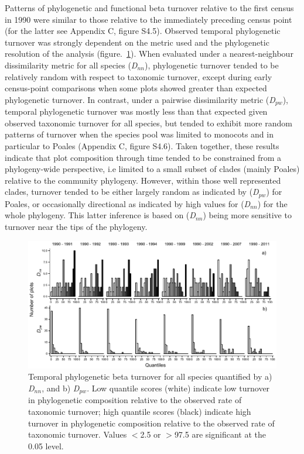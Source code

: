 Patterns of phylogenetic and functional beta turnover relative to the first census in 1990 were similar to those relative to the immediately preceding census point (for the latter see Appendix C, figure S4.5). Observed temporal phylogenetic turnover was strongly dependent on the metric used and the phylogenetic resolution of the analysis (figure.~\ref{phylo_betadiv}). When evaluated under a nearest-neighbour dissimilarity metric for all species (\textit{D}$_{nn}$), phylogenetic turnover tended to be relatively random with respect to taxonomic turnover, except during early census-point comparisons when some plots showed greater than expected phylogenetic turnover. In contrast, under a pairwise dissimilarity metric (\textit{D}$_{pw}$), temporal phylogenetic turnover was mostly less than that expected given observed taxonomic turnover for all species, but tended to exhibit more random patterns of turnover when the species pool was limited to monocots and in particular to Poales (Appendix C, figure S4.6). Taken together, these results indicate that plot composition through time tended to be constrained from a phylogeny-wide perspective, i.e limited to a small subset of clades (mainly Poales) relative to the community phylogeny. However, within those well represented clades, turnover tended to be either largely random as indicated by (\textit{D}$_{pw}$) for Poales, or occasionally directional as indicated by high values for (\textit{D}$_{nn}$) for the whole phylogeny. This latter inference is based on (\textit{D}$_{nn}$) being more sensitive to turnover near the tips of the phylogeny.   



\begin{figure}[H]
\centering
\includegraphics[width=1\linewidth]{Chapter4/Figs/beta_2rows_resize.pdf}
\caption{\footnotesize Temporal phylogenetic beta turnover for all species quantified by a) \textit{D}$_{nn}$, and b) \textit{D}$_{pw}$. Low quantile scores (white) indicate low turnover in phylogenetic composition relative to the observed rate of taxonomic turnover; high quantile scores (black) indicate high turnover in phylogenetic composition relative to the observed rate of taxonomic turnover. Values $<$2.5 or $>$97.5 are significant at the 0.05 level.}
\label{phylo_betadiv}
\end{figure}

